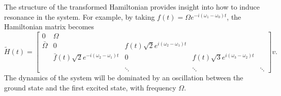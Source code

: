\documentclass[11pt]{article}
\begin{document}
The structure of the transformed Hamiltonian provides insight into how to induce resonance in the
system. For example, by taking $f(t)=\Omega e^{-i(\omega_1 - \omega_0)t}$, the Hamiltonian matrix becomes
\[
\tilde{H}(t) = \begin{bmatrix}
0 & \Omega & & &\\
\bar{\Omega} & 0 & f(t) \sqrt{2} e^{i(\omega_2 -\omega_1) t}& &\\
& \bar{f}(t) \sqrt{2} e^{-i(\omega_2 -\omega_1) t} & 0 & f(t) \sqrt{3} e^{i(\omega_3 -\omega_2)t}
&\\
\\
& & \ddots & \ddots & \ddots
\end{bmatrix}v.
\]
The dynamics of the system will be dominated by an oscillation between the ground state and the
first excited state, with frequency $\Omega$.
\end{document}
